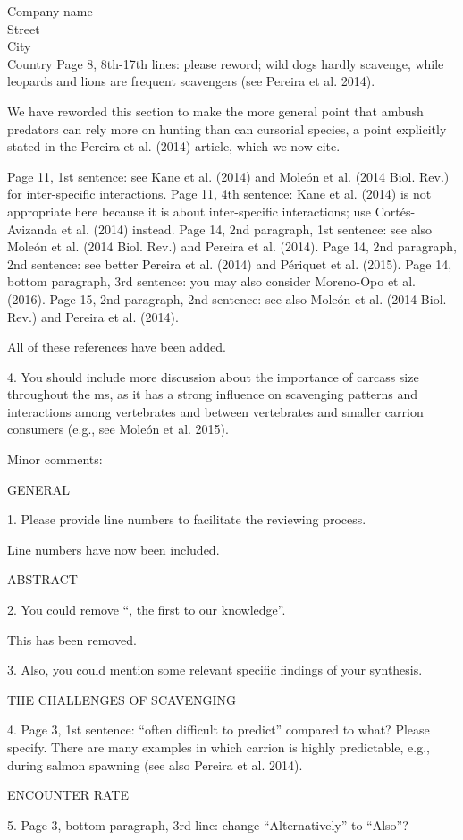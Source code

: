 \documentclass{letter}
\begin{document}
\begin{letter}{Company name \\ Street\\ City\\ Country}
 Page 8, 8th-17th lines: please reword; wild dogs hardly scavenge, while leopards and lions are frequent scavengers (see Pereira et al. 2014).

We have reworded this section to make the more general point that ambush predators can rely more on hunting than can cursorial species, a point explicitly stated in the Pereira et al. (2014) article, which we now cite. 

 Page 11, 1st sentence: see Kane et al. (2014) and Moleón et al. (2014 Biol. Rev.) for inter-specific interactions.
 Page 11, 4th sentence: Kane et al. (2014) is not appropriate here because it is about inter-specific interactions; use Cortés-Avizanda et al. (2014) instead.
 Page 14, 2nd paragraph, 1st sentence: see also Moleón et al. (2014 Biol. Rev.) and Pereira et al. (2014).
 Page 14, 2nd paragraph, 2nd sentence: see better Pereira et al. (2014) and Périquet et al. (2015). 
 Page 14, bottom paragraph, 3rd sentence: you may also consider Moreno-Opo et al. (2016).
 Page 15, 2nd paragraph, 2nd sentence: see also Moleón et al. (2014 Biol. Rev.) and Pereira et al. (2014).

All of these references have been added. 

4. You should include more discussion about the importance of carcass size throughout the ms, as it has a strong influence on scavenging patterns and interactions among vertebrates and between vertebrates and smaller carrion consumers (e.g., see Moleón et al. 2015).

Minor comments:

GENERAL

1. Please provide line numbers to facilitate the reviewing process.

Line numbers have now been included. 

ABSTRACT

2. You could remove “, the first to our knowledge”.

This has been removed.

3. Also, you could mention some relevant specific findings of your synthesis.

THE CHALLENGES OF SCAVENGING

4. Page 3, 1st sentence: “often difficult to predict” compared to what? Please specify. There are many examples in which carrion is highly predictable, e.g., during salmon spawning (see also Pereira et al. 2014).

ENCOUNTER RATE

5. Page 3, bottom paragraph, 3rd line: change “Alternatively” to “Also”?


\end{letter}
\end{document}
